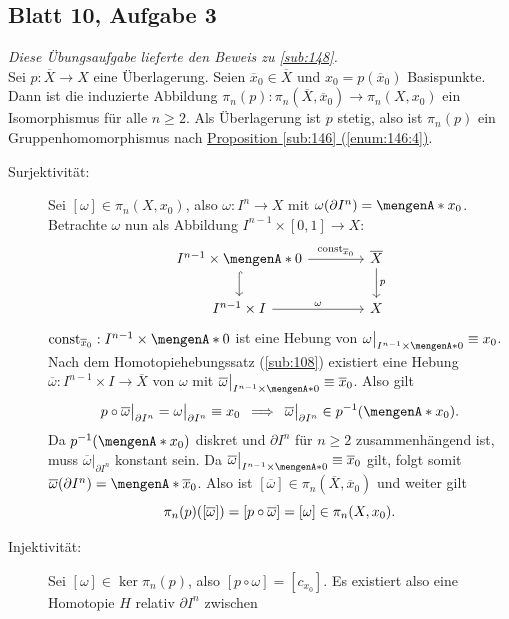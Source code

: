 \subsection{Blatt 10, Aufgabe 3} %
\label{sub:B10A3}
\emph{Diese Übungsaufgabe lieferte den Beweis zu \ref{sub:148}.} \smallskip \\
Sei $p: \overline{X} \to X$ eine Überlagerung. Seien $\overline{x}_0  \in \overline{X}$ und $x_0= p(\overline{x}_0 )$ Basispunkte. Dann ist die induzierte Abbildung 
$\pi_n (p) : \pi_n(\overline{X}, \overline{x}_0) \to \pi_n(X,x_0)$ ein Isomorphismus für alle $n \ge 2$.
Als Überlagerung ist $p$ stetig, also ist $\pi_n(p)$ ein Gruppenhomomorphismus nach \hyperref[enum:146:4]{Proposition \ref*{sub:146} (\ref*{enum:146:4})}.
\begin{description}
	\item[Surjektivität:] Sei $[\omega] \in \pi_n(X,x_0)$, also $\omega : I^n \to X$ mit $\omega(\partial I^n) = \set{x_0}$. Betrachte $\omega$ nun als Abbildung 
	$I^{n-1} \times [0,1] \to X$:
	\[
		\begin{tikzcd}[column sep=4em]
			I^{n-1} \times \set{0} \dar[hook] \rar["\mathrm{const}_{\overline{x}_0}"] & \overline{X} \dar["p"]\\
			I^{n-1} \times I \rar["\omega"] & X  
		\end{tikzcd}
	\]
	$\mathrm{const}_{\overline{x}_0} : I^{n-1} \times \set{0}$ ist eine Hebung von $\omega\big|_{I^{n-1} \times \set{0}} \equiv x_0$. Nach dem Homotopiehebungssatz 
	(\ref{sub:108}) existiert eine Hebung $\overline{\omega} : I^{n-1} \times I \to \overline{X}$ von $\omega$ mit 
	$\overline{\omega}\big|_{I^{n-1} \times \set{0}} \equiv \overline{x}_0 $. Also gilt
	\[
		p \circ \overline{\omega} \big|_{\partial I^n} = \omega \big|_{\partial I^n} \equiv x_0 \enspace \Longrightarrow \enspace \overline{\omega} \big|_{\partial I^n} 
		\in p ^{-1}( \set{x_0} ) .
	\]
	Da $p ^{-1}(\set{x_0})$ diskret und $\partial I^n$ für $n \ge 2$ zusammenhängend ist, muss $\overline{\omega} \big|_{\partial I^n}$ konstant sein. Da 
	$\overline{\omega}\big|_{I^{n-1} \times \set{0}} \equiv \overline{x}_0 $ gilt, folgt somit $\overline{\omega}(\partial I^n) = \set{\overline{x}_0}$. Also ist
	$[\overline{\omega}] \in \pi_n(\overline{X},\overline{x}_0)$ und weiter gilt
	\[
		\pi_n(p) \enbrace*{[\overline{\omega}]} = [p \circ \overline{\omega} ] = [\omega] \in \pi_n(X,x_0). 
	\]
	\item[Injektivität:] Sei $[\omega] \in \ker \pi_n(p)$, also $[p \circ \omega] = [c_{x_0}]$. Es existiert also eine Homotopie $H$ relativ $\partial I^n$ zwischen 

\end{description}
